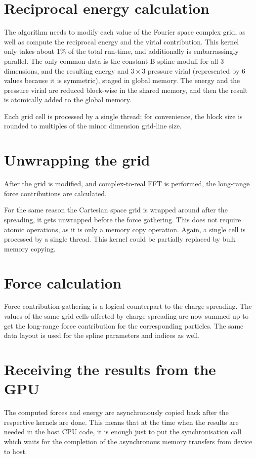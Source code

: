 \documentclass[12pt,a4paper,notitlepage]{report}
\begin{document}
\section{Reciprocal energy calculation}


The algorithm needs to modify each value of the Fourier space complex grid, as well as compute the reciprocal energy and the virial contribution. This kernel only takes about 1\% of the total run-time, and additionally is embarrassingly parallel. The only common data is the constant B-spline moduli for all 3 dimensions, and the resulting energy and $3 \times 3$ pressure virial (represented by 6 values because it is symmetric), staged in global memory. The energy and the pressure virial are reduced block-wise in the shared memory, and then the result is atomically added to the global memory.

Each grid cell is processed by a single thread; for convenience, the block size is rounded to multiples of the minor dimension grid-line size. 

\section{Unwrapping the grid}
After the grid is modified, and complex-to-real FFT is performed, the long-range force contributions are calculated.

For the same reason the Cartesian space grid is wrapped around after the spreading, it gets unwrapped before the force gathering. This does not require atomic operations, as it is only a memory copy operation. Again, a single cell is processed by a single thread. This kernel could be partially replaced by bulk memory copying. 

\section{Force calculation}
Force contribution gathering is a logical counterpart to the charge spreading. The values of the same grid cells affected by charge spreading are now summed up to get the long-range force contribution for the corresponding particles.
The same data layout is used for the spline parameters and indices as well.


\section{Receiving the results from the GPU}
The computed forces and energy are asynchronously copied back after the respective kernels are done. This means that at the time when the results are needed in the host CPU code, it is enough just to put the synchronisation call which waits for the completion of the asynchronous memory transfers from device to host.
\end{document}
